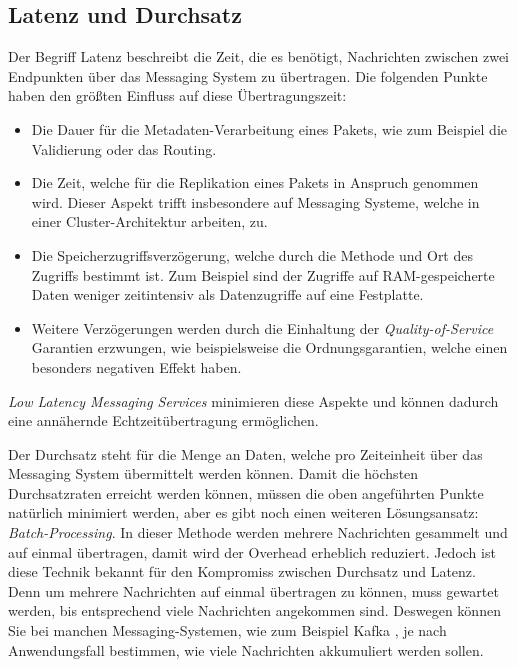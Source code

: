 \subsection{Latenz und Durchsatz}

Der Begriff Latenz beschreibt die Zeit, die es benötigt, Nachrichten zwischen zwei Endpunkten über das Messaging System zu übertragen. Die folgenden Punkte haben den größten Einfluss auf diese Übertragungszeit: \cite{fuFairComparisonMessage2021}

\begin{itemize}
	\item Die Dauer für die Metadaten-Verarbeitung eines Pakets, wie zum Beispiel die Validierung oder das Routing.
	\item Die Zeit, welche für die Replikation eines Pakets in Anspruch genommen wird. Dieser Aspekt trifft insbesondere auf Messaging Systeme, welche in einer Cluster-Architektur arbeiten, zu.
	\item Die Speicherzugriffsverzögerung, welche durch die Methode und Ort des Zugriffs bestimmt ist. Zum Beispiel sind der Zugriffe auf RAM-gespeicherte Daten weniger zeitintensiv als Datenzugriffe auf eine Festplatte.
	\item Weitere Verzögerungen werden durch die Einhaltung der \emph{Quality-of-Service} Garantien erzwungen, wie beispielsweise die Ordnungsgarantien, welche einen besonders negativen Effekt haben.
\end{itemize}

\emph{Low Latency Messaging Services} minimieren diese Aspekte und können dadurch eine annähernde Echtzeitübertragung ermöglichen.

Der Durchsatz steht für die Menge an Daten, welche pro Zeiteinheit über das Messaging System übermittelt werden können. Damit die höchsten Durchsatzraten erreicht werden können, müssen die oben angeführten Punkte natürlich minimiert werden, aber es gibt noch einen weiteren Lösungsansatz: \emph{Batch-Processing}. 
In dieser Methode werden mehrere Nachrichten gesammelt und auf einmal übertragen, damit wird der Overhead erheblich reduziert. Jedoch ist diese Technik bekannt für den Kompromiss zwischen Durchsatz und Latenz. Denn um mehrere Nachrichten auf einmal übertragen zu können, muss gewartet werden, bis entsprechend viele Nachrichten angekommen sind. Deswegen können Sie bei manchen Messaging-Systemen, wie zum Beispiel Kafka \cite{narkhedeKafkaDefinitiveGuide2017}, je nach Anwendungsfall bestimmen, wie viele Nachrichten akkumuliert werden sollen. \cite{fuFairComparisonMessage2021}